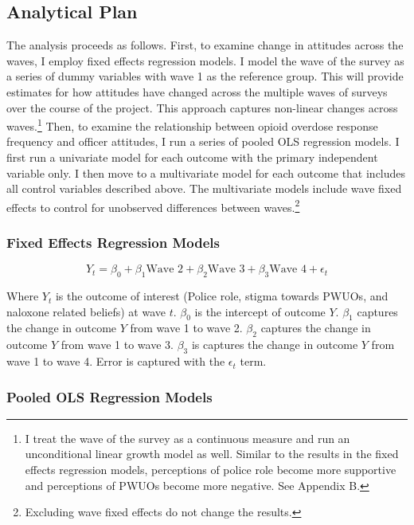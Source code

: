 \subsection{Analytical Plan}

The analysis proceeds as follows. First, to examine change in attitudes across the waves, I employ fixed effects regression models. I model the wave of the survey as a series of dummy variables with wave 1 as the reference group. This will provide estimates for how attitudes have changed across the multiple waves of surveys over the course of the project. This approach captures non-linear changes across waves.\footnote{I treat the wave of the survey as a continuous measure and run an unconditional linear growth model as well. Similar to the results in the fixed effects regression models, perceptions of police role become more supportive and perceptions of PWUOs become more negative. See Appendix B.} Then, to examine the relationship between opioid overdose response frequency and officer attitudes, I run a series of pooled OLS regression models. I first run a univariate model for each outcome with the primary independent variable only. I then move to a multivariate model for each outcome that includes all control variables described above. The multivariate models include wave fixed effects to control for unobserved differences between waves.\footnote{Excluding wave fixed effects do not change the results.} 

\subsubsection{Fixed Effects Regression Models}

\[Y_t = \beta_0 + \beta_1 \text{Wave 2} + \beta_2 \text{Wave 3} + \beta_3 \text{Wave 4} + \epsilon_t \]

Where \(Y_t\) is the outcome of interest (Police role, stigma towards PWUOs, and naloxone related beliefs) at wave \(t\). \(\beta_0\) is the intercept of outcome \(Y\). \(\beta_1\) captures the change in outcome \(Y\) from wave 1 to wave 2. \(\beta_2\) captures the change in outcome \(Y\) from wave 1 to wave 3. \(\beta_3\) is captures the change in outcome \(Y\) from wave 1 to wave 4. Error is captured with the \(\epsilon_t\) term.

\subsubsection{Pooled OLS Regression Models}

